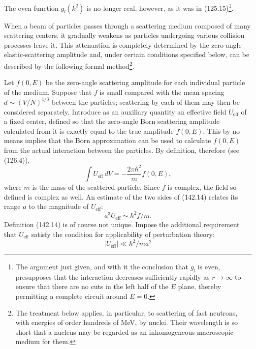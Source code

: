 The even function $g_l(k^2)$ is no longer real, however, as it was in (125.15)\footnote{The argument just given, and with it the conclusion that $g_l$ is even, presupposes that the interaction decreases sufficiently rapidly as $r\to\infty$ to ensure that there are no cuts in the left half of the $E$ plane, thereby permitting a complete circuit around $E=0$.}.

When a beam of particles passes through a scattering medium composed of many scattering centers, it gradually weakens as particles undergoing various collision processes leave it. This attenuation is completely determined by the zero-angle elastic-scattering amplitude and, under certain conditions specified below, can be described by the following formal method\footnote{The treatment below applies, in particular, to scattering of fast neutrons, with energies of order hundreds of MeV, by nuclei. Their wavelength is so short that a nucleus may be regarded as an inhomogeneous macroscopic medium for them.}.

Let $f(0,E)$ be the zero-angle scattering amplitude for each individual particle of the medium. Suppose that $f$ is small compared with the mean spacing $d\sim(V/N)^{1/3}$ between the particles; scattering by each of them may then be considered separately. Introduce as an auxiliary quantity an effective field $U_{\text{eff}}$ of a fixed center, defined so that the zero-angle Born scattering amplitude calculated from it is exactly equal to the true amplitude $f(0,E)$. This by no means implies that the Born approximation can be used to calculate $f(0,E)$ from the actual interaction between the particles. By definition, therefore (see (126.4)),
\begin{equation}
 \int U_{\text{eff}}\,dV=-\frac{2\pi\hbar^2}{m}f(0,E),
 \tag{142.14}
\end{equation}
where $m$ is the mass of the scattered particle. Since $f$ is complex, the field so defined is complex as well. An estimate of the two sides of (142.14) relates its range $a$ to the magnitude of $U_{\text{eff}}$:
\begin{equation}
 a^3U_{\text{eff}}\sim\hbar^2f/m.
 \tag{142.15}
\end{equation}
Definition (142.14) is of course not unique. Impose the additional requirement that $U_{\text{eff}}$ satisfy the condition for applicability of perturbation theory:
\begin{equation}
 |U_{\text{eff}}|\ll\hbar^2/ma^2
 \tag{142.16}
\end{equation}

